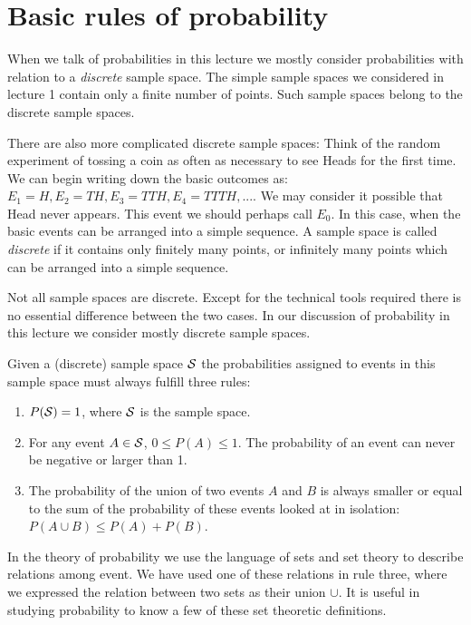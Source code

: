 \documentclass[
]{book}
\providecommand{\tightlist}{%
  \setlength{\itemsep}{0pt}\setlength{\parskip}{0pt}}
\begin{document}
\hypertarget{basic-rules-of-probability}{%
\section{Basic rules of probability}\label{basic-rules-of-probability}}

When we talk of probabilities in this lecture we mostly consider probabilities with relation
to a \emph{discrete} sample space. The simple sample spaces we considered in lecture 1 contain only a
finite number of points. Such sample spaces belong to the discrete sample spaces.

There are also more
complicated discrete sample spaces: Think of the random experiment of tossing a coin as often as
necessary to see Heads for the first time. We can begin writing down the basic outcomes as:
\(E_1=H, E_2=TH, E_3 = TTH, E_4 = TTTH, ...\). We may consider it possible that Head never appears. This
event we should perhaps call \(E_0\). In this case, when the basic events can be arranged into a simple sequence.
A sample space is called \emph{discrete} if it contains only finitely many points, or infinitely many
points which can be arranged into a simple sequence.

Not all sample spaces are discrete.
Except for the
technical tools required there is no essential difference between the two cases. In our discussion
of probability in this lecture we consider mostly discrete sample spaces.

Given a (discrete) sample space \({\cal S}\) the probabilities assigned to events in this sample
space must always fulfill three rules:

\begin{enumerate}
\def\labelenumi{\arabic{enumi}.}
\tightlist
\item
  \(P({\cal S}) = 1\), where \({\cal S}\) is the sample space.
\item
  For any event \(A \in {\cal S}\), \(0 \leq P(A) \leq 1\). The probability of an event can never be
  negative or larger than 1.
\item
  The probability of the union of two events \(A\) and \(B\) is always smaller or equal to the sum of the
  probability of these events looked at in isolation: \(P(A \cup B) \leq P(A) + P(B)\).
\end{enumerate}

In the theory of probability we use the language of sets and set theory to
describe relations among event.
We have used one of these relations in rule three, where we expressed the relation between two sets
as their union \(\cup\). It is useful in studying probability
to know a few of these set theoretic definitions.
\end{document}
